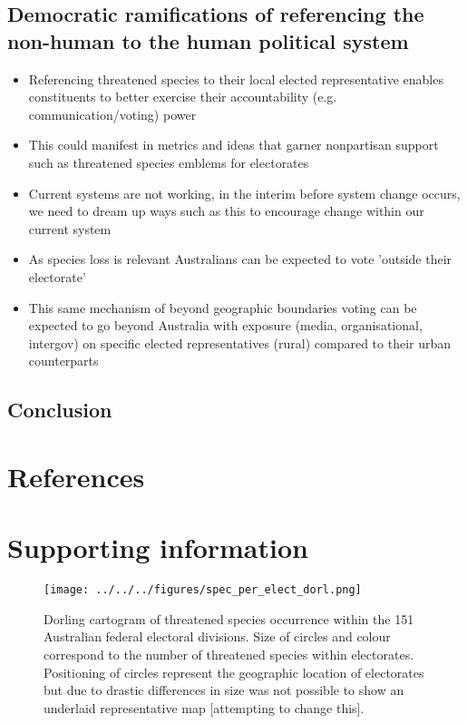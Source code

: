 \documentclass[a4paper,11pt]{article}
\begin{document}
\subsection{Democratic ramifications of referencing the non-human to the human political system}

\begin{itemize}
    \item Referencing threatened species to their local elected representative enables constituents to better exercise their accountability (e.g. communication/voting) power
    \item This could manifest in metrics and ideas that garner nonpartisan support such as threatened species emblems for electorates
    \item Current systems are not working, in the interim before system change occurs, we need to dream up ways such as this to encourage change within our current system
    \item As species loss is relevant Australians can be expected to vote 'outside their electorate'
    \item This same mechanism of beyond geographic boundaries voting can be expected to go beyond Australia with exposure (media, organisational, intergov) on specific elected representatives (rural) compared to their urban counterparts
\end{itemize}

\subsection{Conclusion}

\newpage
\nolinenumbers
\section{References}
\printbibliography

\newpage
\section{Supporting information}

\begin{figure}[H]
	\centering
    \texttt{[image: ../../../figures/spec\_per\_elect\_dorl.png]}
    \caption{Dorling cartogram of threatened species occurrence within the 151 Australian federal electoral divisions. Size of circles and colour correspond to the number of threatened species within electorates. Positioning of circles represent the geographic location of electorates but due to drastic differences in size was not possible to show an underlaid representative map [attempting to change this].}
    \label{fig:dorl}
\end{figure}
\end{document}
